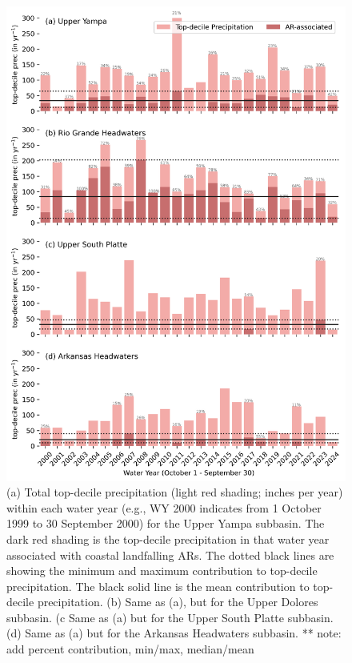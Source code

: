 \documentclass[draft]{agujournal2019}
\begin{document}
\begin{figure}
\noindent\includegraphics[width=\textwidth, height=\textheight, keepaspectratio]{fig8.png}

\caption{(a) Total top-decile precipitation (light red shading; inches per year) within each water year (e.g., WY 2000 indicates from 1 October 1999 to 30 September 2000) for the Upper Yampa subbasin. The dark red shading is the top-decile precipitation in that water year associated with coastal landfalling ARs. The dotted black lines are showing the minimum and maximum contribution to top-decile precipitation. The black solid line is the mean contribution to top-decile precipitation. (b) Same as (a), but for the Upper Dolores subbasin. (c Same as (a) but for the Upper South Platte subbasin. (d) Same as (a) but for the Arkansas Headwaters subbasin. ** note: add percent contribution, min/max, median/mean}
\label{fig:time_series}
\end{figure}
\end{document}
